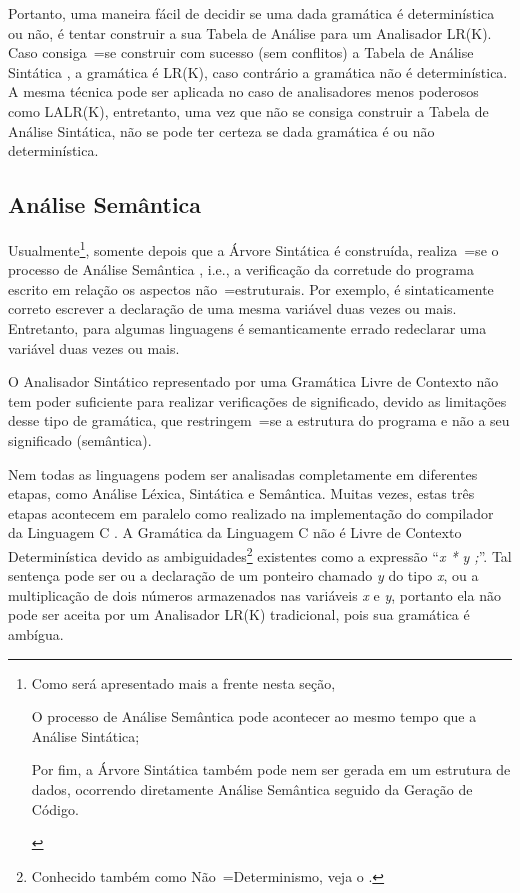 Portanto,
uma maneira fácil de decidir se uma dada gramática é determinística ou
não,
é tentar construir a sua Tabela de Análise para um Analisador LR(K).
Caso consiga~=se construir com sucesso (sem conflitos) a Tabela de Análise Sintática \cite{ahoCompilerDragonBook},
a gramática é LR(K),
caso contrário a gramática não é determinística.
A mesma técnica pode ser aplicada no caso de analisadores menos poderosos como LALR(K),
entretanto,
uma vez que não se consiga construir a Tabela de Análise Sintática,
não se pode ter certeza se dada gramática é ou
não determinística.


\subsection{Análise Semântica}
\label{analiseSemantica}

Usualmente\footnote{
Como será apresentado mais a frente nesta seção,
\begin{inparaenum}[1)]
\item O processo de Análise Semântica pode acontecer ao mesmo tempo que a Análise Sintática;
\item Por fim,
a Árvore Sintática também pode nem ser gerada em um estrutura de dados,
ocorrendo diretamente Análise Semântica seguido da Geração de Código.
\end{inparaenum}%
},
somente depois que a Árvore Sintática é construída,
realiza~=se o processo de Análise Semântica \cite{ahoCompilerDragonBook},
i.e.,
a verificação da corretude do programa escrito em relação os aspectos não~=estruturais.
Por exemplo,
é sintaticamente correto escrever a declaração de uma mesma variável duas vezes ou
mais. Entretanto,
para algumas linguagens é semanticamente errado redeclarar uma variável duas vezes ou
mais.

O Analisador Sintático representado por uma Gramática Livre de Contexto não tem poder suficiente para realizar verificações de significado,
devido as limitações desse tipo de gramática,
que restringem~=se a estrutura do programa e
não a seu significado (semântica).

Nem todas as linguagens podem ser analisadas completamente em diferentes etapas,
como Análise Léxica, Sintática e Semântica. Muitas vezes,
estas três etapas acontecem em paralelo como realizado na implementação do compilador da Linguagem C \cite{jourdan2017,whyCcannotBeParsedWithALR1Parser}.
A Gramática da Linguagem C não é Livre de Contexto Determinística devido as ambiguidades\footnote{
Conhecido também como Não~=Determinismo,
veja o .
}
existentes como a expressão ``\textit{x * y ;}''.
Tal sentença pode ser ou
a declaração de um ponteiro chamado \textit{y} do tipo \textit{x},
ou a multiplicação de dois números armazenados nas variáveis \textit{x} e
\textit{y},
portanto ela não pode ser aceita por um Analisador LR(K) tradicional,
pois sua gramática é ambígua.

